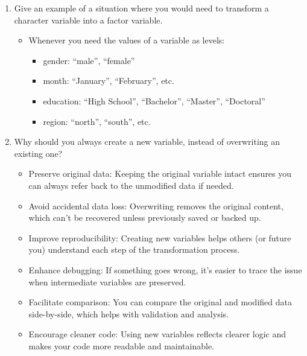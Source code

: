 \documentclass[12pt,a4paper]{article}
\providecommand{\tightlist}{%
  \setlength{\itemsep}{0pt}\setlength{\parskip}{0pt}}
\begin{document}
\begin{enumerate}
\begin{itemize}
    \begin{itemize}
    \tightlist
    \item
      Descriptive stats are a critical first step before performing
      inferential statistics or building models.
    \end{itemize}
  \end{itemize}
\item
  Give an example of a situation where you would need to transform a
  character variable into a factor variable.

  \begin{itemize}
  \tightlist
  \item
    Whenever you need the values of a variable as levels:

    \begin{itemize}
    \tightlist
    \item
      gender: ``male'', ``female''
    \item
      month: ``January'', ``February'', etc.
    \item
      education: ``High School'', ``Bachelor'', ``Master'', ``Doctoral''
    \item
      region: ``north'', ``south'', etc.
    \end{itemize}
  \end{itemize}
\item
  Why should you always create a new variable, instead of overwriting an
  existing one?

  \begin{itemize}
  \tightlist
  \item
    Preserve original data: Keeping the original variable intact ensures
    you can always refer back to the unmodified data if needed.
  \item
    Avoid accidental data loss: Overwriting removes the original
    content, which can't be recovered unless previously saved or backed
    up.
  \item
    Improve reproducibility: Creating new variables helps others (or
    future you) understand each step of the transformation process.
  \item
    Enhance debugging: If something goes wrong, it's easier to trace the
    issue when intermediate variables are preserved.
  \item
    Facilitate comparison: You can compare the original and modified
    data side-by-side, which helps with validation and analysis.
  \item
    Encourage cleaner code: Using new variables reflects clearer logic
    and makes your code more readable and maintainable.
  \end{itemize}
\end{enumerate}


\printbibliography[title=List of References]
\end{document}
